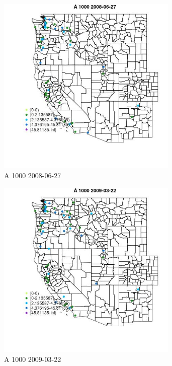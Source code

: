 \begin{figure} 
\centering  
\includegraphics[width=0.77\textwidth]{Code_Outputs/Report_ML_input_PM25_Step4_part_e_de_duplicated_aves_MapObsA_10002008-06-27.jpg} 
\caption{\label{fig:Report_ML_input_PM25_Step4_part_e_de_duplicated_avesMapObsA_10002008-06-27}A 1000 2008-06-27} 
\end{figure} 
 

\begin{figure} 
\centering  
\includegraphics[width=0.77\textwidth]{Code_Outputs/Report_ML_input_PM25_Step4_part_e_de_duplicated_aves_MapObsA_10002009-03-22.jpg} 
\caption{\label{fig:Report_ML_input_PM25_Step4_part_e_de_duplicated_avesMapObsA_10002009-03-22}A 1000 2009-03-22} 
\end{figure} 
 

